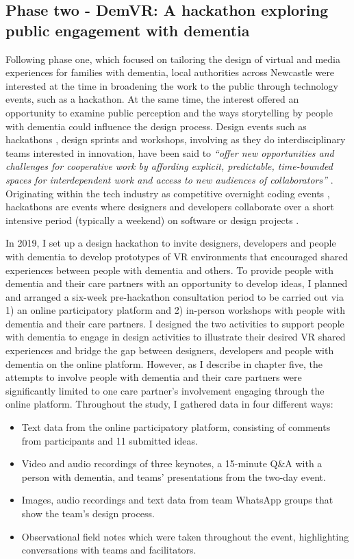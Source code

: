 \subsection{Phase two - DemVR: A hackathon exploring public engagement with dementia}

Following phase one, which focused on tailoring the design of virtual and media experiences for families with dementia, local authorities across Newcastle were interested at the time in broadening the work to the public through technology events, such as a hackathon. At the same time, the interest offered an opportunity to examine public perception and the ways storytelling by people with dementia could influence the design process. Design events such as hackathons \citep{olesen_what_2021}, design sprints and workshops, involving as they do interdisciplinary teams interested in innovation, have been said to \textit{``offer new opportunities and challenges for cooperative work by affording explicit, predictable, time-bounded spaces for interdependent work and access to new audiences of collaborators''} \citep{filippova_hacking_2017}. Originating within the tech industry as competitive overnight coding events \citep{jones_theres_2015}, hackathons are events where designers and developers collaborate over a short intensive period (typically a weekend) on software or design projects \citep{nandi_hackathons_2016}. 

In 2019, I set up a design hackathon to invite designers, developers and people with dementia to develop prototypes of VR environments that encouraged shared experiences between people with dementia and others. To provide people with dementia and their care partners with an opportunity to develop ideas, I planned and arranged a six-week pre-hackathon consultation period to be carried out via 1) an online participatory platform and 2) in-person workshops with people with dementia and their care partners. I designed the two activities to support people with dementia to engage in design activities to illustrate their desired VR shared experiences and bridge the gap between designers, developers and people with dementia on the online platform. However, as I describe in chapter five, the attempts to involve people with dementia and their care partners were significantly limited to one care partner's involvement engaging through the online platform. Throughout the study, I gathered data in four different ways:
\begin{itemize}
    \item Text data from the online participatory platform, consisting of comments from participants and 11 submitted ideas.
    \item Video and audio recordings of three keynotes, a 15-minute Q\&A with a person with dementia, and teams' presentations from the two-day event.
    \item Images, audio recordings and text data from team WhatsApp groups that show the team's design process.
    \item Observational field notes which were taken throughout the event, highlighting conversations with teams and facilitators.
\end{itemize}

